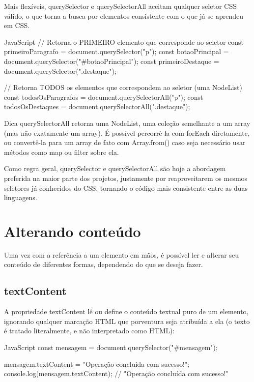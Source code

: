 Mais flexíveis, querySelector e querySelectorAll aceitam qualquer seletor CSS válido, o que torna a busca por elementos consistente com o que já se aprendeu em CSS.

\begin{codebox}{JavaScript}
// Retorna o PRIMEIRO elemento que corresponde ao seletor
const primeiroParagrafo = document.querySelector("p");
const botaoPrincipal = document.querySelector("#botaoPrincipal");
const primeiroDestaque = document.querySelector(".destaque");

// Retorna TODOS os elementos que correspondem ao seletor (uma NodeList)
const todosOsParagrafos = document.querySelectorAll("p");
const todosOsDestaques = document.querySelectorAll(".destaque");
\end{codebox}

\begin{infobox}{Dica}
querySelectorAll retorna uma NodeList, uma coleção semelhante a um array (mas não exatamente um array). É possível percorrê-la com forEach diretamente, ou convertê-la para um array de fato com Array.from() caso seja necessário usar métodos como map ou filter sobre ela.
\end{infobox}

Como regra geral, querySelector e querySelectorAll são hoje a abordagem preferida na maior parte dos projetos, justamente por reaproveitarem os mesmos seletores já conhecidos do CSS, tornando o código mais consistente entre as duas linguagens.

\section{Alterando conteúdo}

Uma vez com a referência a um elemento em mãos, é possível ler e alterar seu conteúdo de diferentes formas, dependendo do que se deseja fazer.

\subsection{textContent}

A propriedade textContent lê ou define o conteúdo textual puro de um elemento, ignorando qualquer marcação HTML que porventura seja atribuída a ela (o texto é tratado literalmente, e não interpretado como HTML):

\begin{codebox}{JavaScript}
const mensagem = document.querySelector("#mensagem");

mensagem.textContent = "Operação concluída com sucesso!";
console.log(mensagem.textContent); // "Operação concluída com sucesso!"
\end{codebox}

